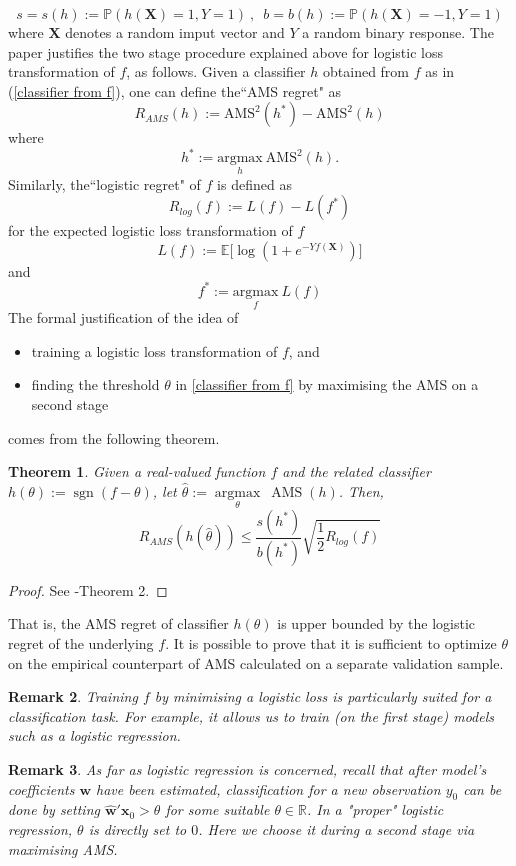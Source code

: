 \documentclass[]{article}
\newtheorem{theorem}{Theorem}[section]
\newtheorem{remark}[theorem]{Remark}
\begin{document}
$$s=s(h):=\mathbb{P}(h(\bm{X})=1,Y=1) \ \text{,} \ \ \ b=b(h):=\mathbb{P}(h(\bm{X})=-1,Y=1)$$
where $\bm{X}$ denotes a random imput vector and $Y$ a random binary response. The paper justifies the two stage procedure explained above for logistic loss transformation of $f$, as follows. Given a classifier $h$ obtained from $f$ as in (\ref{classifier from f}), one can define the``AMS regret" as
\begin{equation}
\label{regret}
R_{AMS}(h):= \text{AMS}^2(h^*)-\text{AMS}^2(h)
\end{equation}
where $$h^*:=\underset{h}{\text{argmax}} \ \text{AMS}^2(h).$$
Similarly, the``logistic regret" of $f$ is defined as
\begin{equation}
\label{logistic regret}
R_{log}(f):= L(f)-L(f^*)
\end{equation}
for the expected logistic loss transformation of $f$ $$L(f):=\mathbb{E}\Big[\log(1+e^{-Yf(\bm{X})})\Big]$$ and $$f^*:=\underset{f}{\text{argmax}} \ L(f)$$
The formal justification of the idea of 
\begin{itemize}
\item training a logistic loss transformation of $f$, and
\item finding the threshold $\theta$ in \ref{classifier from f} by maximising the AMS on a second stage
\end{itemize}
comes from the following theorem.

\begin{theorem}
\label{thm: two stage maximisation}
Given a real-valued function $f$ and the related classifier $h(\theta):=\operatorname{sgn}(f-\theta)$,  let $\hat{\theta}:=\underset{\theta}{\operatorname{argmax}} \ \operatorname{AMS}(h)$. Then,
\begin{equation}
\label{regret inequality}
R_{AMS}(h(\hat{\theta}))\leq \frac{s(h^*)}{b(h^*)}\sqrt{\frac{1}{2}R_{log}(f)}
\end{equation}

\end{theorem}
\begin{proof}
 See \cite{kotlowski2014consistent}-Theorem 2.
\end{proof}

That is, the AMS regret of classifier $h(\theta)$ is upper bounded by the logistic regret of the underlying $f$. It is possible to prove that it is sufficient to optimize $\theta$ on the empirical counterpart of AMS calculated on a separate validation sample. 


\begin{remark}
Training $f$ by minimising a logistic loss is particularly suited for a classification task. For example, it allows us to train (on the first stage) models such as a logistic regression. 
\end{remark}
\begin{remark}
As far as logistic regression is concerned, recall that after model's coefficients $\bm{w}$ have been estimated, classification for a new observation $y_0$ can be done by setting  $\hat{\bm{w}}'\bm{x}_0>\theta$ for some suitable $\theta \in \mathbb{R}$. In a "proper" logistic regression, $\theta$ is directly set to $0$. Here we choose it during a second stage via maximising AMS.
\end{remark}
\end{document}
